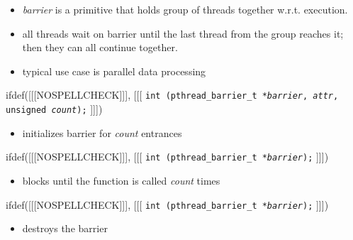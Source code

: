\begin{slide}
\begin{itemize}
\item \emph{barrier} is a primitive that holds group of threads together
w.r.t. execution.
\item all threads wait on barrier until the last thread from the group
reaches it; then they can all continue together.
\item typical use case is parallel data processing
\end{itemize}
ifdef([[[NOSPELLCHECK]]], [[[
\texttt{int (pthread\_barrier\_t *\emph{barrier},
\emph{attr}, unsigned \emph{count});}
]]])
\begin{itemize}
\item initializes barrier for \emph{count} entrances
\end{itemize}
ifdef([[[NOSPELLCHECK]]], [[[
\texttt{int (pthread\_barrier\_t *\emph{barrier});}
]]])
\begin{itemize}
\item blocks until the function is called \emph{count} times
\end{itemize}
ifdef([[[NOSPELLCHECK]]], [[[
\texttt{int (pthread\_barrier\_t *\emph{barrier});}
]]])
\begin{itemize}
\item destroys the barrier
\end{itemize}
\end{slide}

\label{BARRIER}

